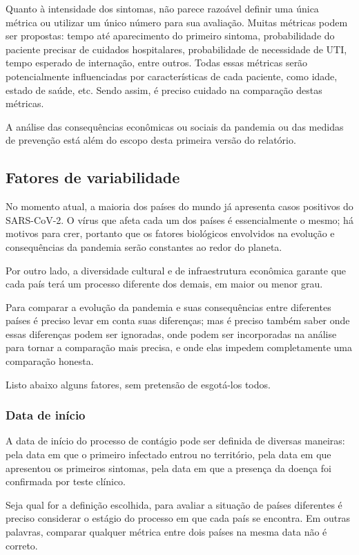 \documentclass[12pt]{extarticle}
\begin{document}
Quanto à intensidade dos sintomas, não parece razoável definir uma única métrica ou utilizar um único número para sua avaliação. Muitas métricas podem ser propostas: tempo até aparecimento do primeiro sintoma, probabilidade do paciente precisar de cuidados hospitalares, probabilidade de necessidade de UTI, tempo esperado de internação, entre outros. Todas essas métricas serão potencialmente influenciadas por características de cada paciente, como idade, estado de saúde, etc. Sendo assim, é preciso cuidado na comparação destas métricas.

A análise das consequências econômicas ou sociais da pandemia ou das medidas de prevenção está além do escopo desta primeira versão do relatório.

\subsection{Fatores de variabilidade}

No momento atual, a maioria dos países do mundo já apresenta casos positivos do SARS-CoV-2. O vírus que afeta cada um dos países é essencialmente o mesmo; há motivos para crer, portanto que os fatores biológicos envolvidos na evolução e consequências da pandemia serão constantes ao redor do planeta.

Por outro lado, a diversidade cultural e de infraestrutura econômica garante que cada país terá um processo diferente dos demais, em maior ou menor grau.

Para comparar a evolução da pandemia e suas consequências entre diferentes países é preciso levar em conta suas diferenças; mas é preciso também saber onde essas diferenças podem ser ignoradas, onde podem ser incorporadas na análise para tornar a comparação mais precisa, e onde elas impedem completamente uma comparação honesta. 

Listo abaixo alguns fatores, sem pretensão de esgotá-los todos.

\subsubsection{Data de início}

A data de início do processo de contágio pode ser definida de diversas maneiras: pela data em que o primeiro infectado entrou no território, pela data em que apresentou os primeiros sintomas, pela data em que a presença da doença foi confirmada por teste clínico.

Seja qual for a definição escolhida, para avaliar a situação de países diferentes é preciso considerar o estágio do processo em que cada país se encontra. Em outras palavras, comparar qualquer métrica entre dois países na mesma data não é correto.
\end{document}

